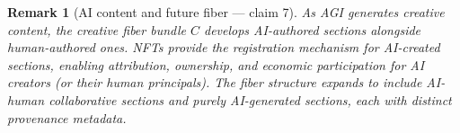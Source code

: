 \documentclass[11pt,a4paper]{article}
\newtheorem{remark}[definition]{Remark}
\begin{document}
\begin{remark}[AI content and future fiber --- claim 7]
As AGI generates creative content, the creative fiber bundle $C$
develops AI-authored sections alongside human-authored ones. NFTs
provide the registration mechanism for AI-created sections, enabling
attribution, ownership, and economic participation for AI creators
(or their human principals). The fiber structure expands to include
AI-human collaborative sections and purely AI-generated sections,
each with distinct provenance metadata.
\end{remark}
\end{document}
